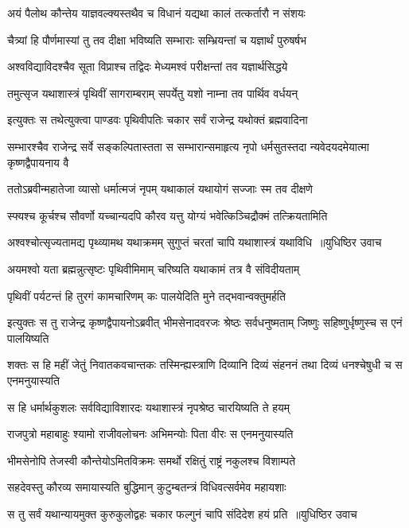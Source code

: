 \twolineshloka
{अयं पैलोथ कौन्तेय याज्ञवल्क्यस्तथैव च}
{विधानं यद्यथा कालं तत्कर्तारौ न संशयः}


\twolineshloka
{चैत्र्यां हि पौर्णमास्यां तु तव दीक्षा भविष्यति}
{सम्भाराः सम्भ्रियन्तां च यज्ञार्थं पुरुषर्षभ}


\twolineshloka
{अश्वविद्याविदश्चैव सूता विप्राश्च तद्विदः}
{मेध्यमश्वं परीक्षन्तां तव यज्ञार्थसिद्धये}


\twolineshloka
{तमुत्सृज यथाशास्त्रं पृथिवीं सागराम्बराम्}
{सपर्येतु यशो नाम्ना तव पार्थिव वर्धयन्}


\twolineshloka
{इत्युक्तः स तथेत्युक्त्वा पाण्डवः पृथिवीपतिः}
{चकार सर्वं राजेन्द्र यथोक्तं ब्रह्मवादिना}


सम्भारश्चैव राजेन्द्र सर्वे सङ्कल्पितास्तता
\twolineshloka
{स सम्भारान्समाहृत्य नृपो धर्मसुतस्तदा}
{न्यवेदयदमेयात्मा कृष्णद्वैपायनाय वै}


\twolineshloka
{ततोऽब्रवीन्महातेजा व्यासो धर्मात्मजं नृपम्}
{यथाकालं यथायोगं सज्जाः स्म तव दीक्षणे}


\twolineshloka
{स्फ्यश्च कूर्चश्च सौवर्णो यच्चान्यदपि कौरव}
{यत्तु योग्यं भवेत्किञ्चिद्रौक्मं तत्क्रियतामिति}


\threelineshloka
{अश्वश्चोत्सृज्यतामद्य पृथ्व्यामथ यथाक्रमम्}
{सुगुप्तं चरतां चापि यथाशास्त्रं यथाविधि ॥युधिष्ठिर उवाच}
{}


\twolineshloka
{अयमश्वो यता ब्रह्मन्नुत्सृष्टः पृथिवीमिमाम्}
{चरिष्यति यथाकामं तत्र वै संविदीयताम्}


\twolineshloka
{पृथिवीं पर्यटन्तं हि तुरगं कामचारिणम्}
{कः पालयेदिति मुने तद्भवान्वक्तुमर्हति}


\threelineshloka
{इत्युक्तः स तु राजेन्द्र कृष्णद्वैपायनोऽब्रवीत्}
{भीमसेनादवरजः श्रेष्ठः सर्वधनुष्मताम्}
{जिष्णुः सहिष्णुर्धृष्णुस्च स एनं पालयिष्यति}


\threelineshloka
{शक्तः स हि महीं जेतुं निवातकवचान्तकः}
{तस्मिन्ह्यस्त्राणि दिव्यानि दिव्यं संहननं तथा}
{दिव्यं धनश्चेषुधी च स एनमनुयास्यति}


\twolineshloka
{स हि धर्मार्थकुशलः सर्वविद्याविशारदः}
{यथाशास्त्रं नृपश्रेष्ठ चारयिष्यति ते हयम्}


\twolineshloka
{राजपुत्रो महाबाहुः श्यामो राजीवलोचनः}
{अभिमन्योः पिता वीरः स एनमनुयास्यति}


\twolineshloka
{भीमसेनोपि तेजस्वी कौन्तेयोऽमितविक्रमः}
{समर्थो रक्षितुं राष्ट्रं नकुलश्च विशाम्पते}


\twolineshloka
{सहदेवस्तु कौरव्य समायास्यति बुद्धिमान्}
{कुटुम्बतन्त्रं विधिवत्सर्वमेव महायशाः}


\threelineshloka
{स तु सर्वं यथान्यायमुक्त कुरुकुलोद्वहः}
{चकार फल्गुनं चापि संदिदेश हयं प्रति ॥युधिष्ठिर उवाच}
{}


